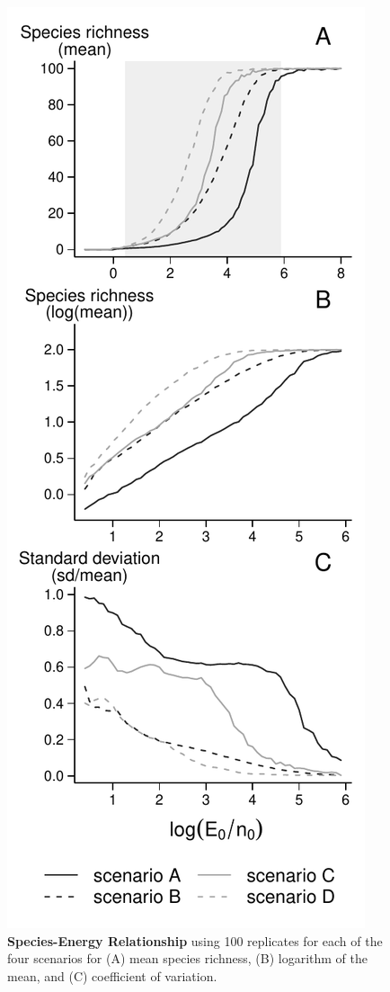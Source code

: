 \begin{figure}[htbp]
\centering
\includegraphics{chapitre4/fig/fig1.pdf}
\caption{\textbf{Species-Energy Relationship} using 100 replicates for
each of the four scenarios for (A) mean species richness, (B) logarithm
of the mean, and (C) coefficient of variation.\label{fig:etib1}}
\end{figure}

